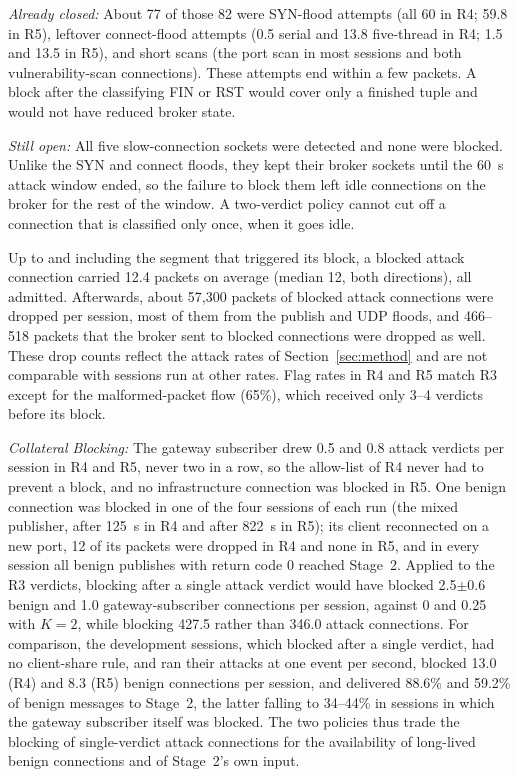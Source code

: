 \documentclass[journal]{IEEEtran}
\begin{document}
\textit{Already closed:} About 77 of those 82 were SYN-flood attempts (all 60 in R4; 59.8 in R5), leftover connect-flood attempts (0.5 serial and 13.8 five-thread in R4; 1.5 and 13.5 in R5), and short scans (the port scan in most sessions and both vulnerability-scan connections). These attempts end within a few packets. A block after the classifying FIN or RST would cover only a finished tuple and would not have reduced broker state.

\textit{Still open:} All five slow-connection sockets were detected and none were blocked. Unlike the SYN and connect floods, they kept their broker sockets until the 60~s attack window ended, so the failure to block them left idle connections on the broker for the rest of the window. A two-verdict policy cannot cut off a connection that is classified only once, when it goes idle.

Up to and including the segment that triggered its block, a blocked attack connection carried 12.4 packets on average (median 12, both directions), all admitted. Afterwards, about 57,300 packets of blocked attack connections were dropped per session, most of them from the publish and UDP floods, and 466--518 packets that the broker sent to blocked connections were dropped as well. These drop counts reflect the attack rates of Section~\ref{sec:method} and are not comparable with sessions run at other rates. Flag rates in R4 and R5 match R3 except for the malformed-packet flow (65\%), which received only 3--4 verdicts before its block.

\textit{Collateral Blocking:} The gateway subscriber drew 0.5 and 0.8 attack verdicts per session in R4 and R5, never two in a row, so the allow-list of R4 never had to prevent a block, and no infrastructure connection was blocked in R5. One benign connection was blocked in one of the four sessions of each run (the mixed publisher, after 125~s in R4 and after 822~s in R5); its client reconnected on a new port, 12 of its packets were dropped in R4 and none in R5, and in every session all benign publishes with return code 0 reached Stage~2. Applied to the R3 verdicts, blocking after a single attack verdict would have blocked 2.5$\pm$0.6 benign and 1.0 gateway-subscriber connections per session, against 0 and 0.25 with $K = 2$, while blocking 427.5 rather than 346.0 attack connections. For comparison, the development sessions, which blocked after a single verdict, had no client-share rule, and ran their attacks at one event per second, blocked 13.0 (R4) and 8.3 (R5) benign connections per session, and delivered 88.6\% and 59.2\% of benign messages to Stage~2, the latter falling to 34--44\% in sessions in which the gateway subscriber itself was blocked. The two policies thus trade the blocking of single-verdict attack connections for the availability of long-lived benign connections and of Stage~2's own input.
\end{document}
